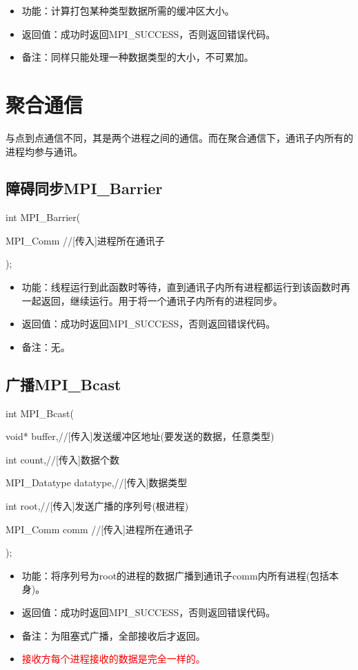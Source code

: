 \documentclass[UTF8]{article}%
\begin{document}
\begin{itemize}
    \item 功能：计算打包某种类型数据所需的缓冲区大小。
    \item 返回值：成功时返回MPI\_SUCCESS，否则返回错误代码。
    \item 备注：同样只能处理一种数据类型的大小，不可累加。
\end{itemize}

\section{聚合通信}

与点到点通信不同，其是两个进程之间的通信。而在聚合通信下，通讯子内所有的进程均参与通讯。

\subsection{障碍同步MPI\_Barrier}

int MPI\_Barrier(
    
    \qquad MPI\_Comm //[传入]进程所在通讯子
    
);

\begin{itemize}
    \item 功能：线程运行到此函数时等待，直到通讯子内所有进程都运行到该函数时再一起返回，继续运行。用于将一个通讯子内所有的进程同步。
    \item 返回值：成功时返回MPI\_SUCCESS，否则返回错误代码。
    \item 备注：无。
\end{itemize}

\subsection{广播MPI\_Bcast}

int MPI\_Bcast(

    \qquad void* buffer,//[传入]发送缓冲区地址(要发送的数据，任意类型)
    
    \qquad int count,//[传入]数据个数
    
    \qquad MPI\_Datatype datatype,//[传入]数据类型
    
    \qquad int root,//[传入]发送广播的序列号(根进程)
    
    \qquad MPI\_Comm comm //[传入]进程所在通讯子
    
);

\begin{itemize}
    \item 功能：将序列号为root的进程的数据广播到通讯子comm内所有进程(包括本身)。
    \item 返回值：成功时返回MPI\_SUCCESS，否则返回错误代码。
    \item 备注：为阻塞式广播，全部接收后才返回。
    \item \textcolor{red}{接收方每个进程接收的数据是完全一样的。}
\end{itemize}
\end{document}

